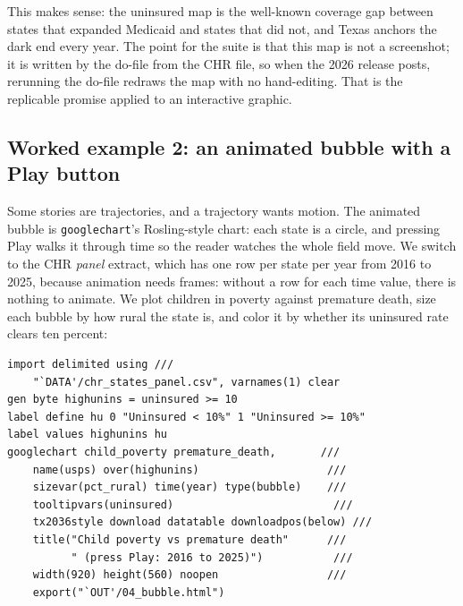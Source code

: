 \documentclass[
    a4paper,
    fontsize=10pt,
    twoside=true,
    numbers=noenddot,
]{kaobook}
\begin{document}
This makes sense: the uninsured map is the well-known coverage gap between states that expanded Medicaid and states that did not, and Texas anchors the dark end every year. The point for the suite is that this map is not a screenshot; it is written by the do-file from the CHR file, so when the 2026 release posts, rerunning the do-file redraws the map with no hand-editing. That is the replicable promise applied to an interactive graphic.

\subsection{Worked example 2: an animated bubble with a Play button}\label{sec:gc-bubble}
Some stories are trajectories, and a trajectory wants motion. The animated bubble is \texttt{googlechart}'s Rosling-style chart: each state is a circle, and pressing Play walks it through time so the reader watches the whole field move. We switch to the CHR \emph{panel} extract, which has one row per state per year from 2016 to 2025, because animation needs frames: without a row for each time value, there is nothing to animate. We plot children in poverty against premature death, size each bubble by how rural the state is, and color it by whether its uninsured rate clears ten percent:
{\footnotesize
\begin{verbatim}
import delimited using ///
    "`DATA'/chr_states_panel.csv", varnames(1) clear
gen byte highunins = uninsured >= 10
label define hu 0 "Uninsured < 10%" 1 "Uninsured >= 10%"
label values highunins hu
googlechart child_poverty premature_death,       ///
    name(usps) over(highunins)                    ///
    sizevar(pct_rural) time(year) type(bubble)    ///
    tooltipvars(uninsured)                         ///
    tx2036style download datatable downloadpos(below) ///
    title("Child poverty vs premature death"      ///
          " (press Play: 2016 to 2025)")           ///
    width(920) height(560) noopen                 ///
    export("`OUT'/04_bubble.html")
\end{verbatim}
}
\end{document}
